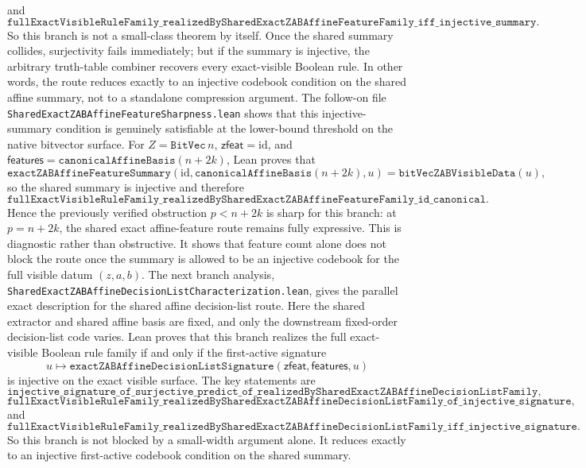 \documentclass[11pt]{article}
\theoremstyle{remark}
\begin{document}
and
\[
  \texttt{fullExactVisibleRuleFamily\_realizedBySharedExactZABAffineFeatureFamily\_iff\_injective\_summary}.
\]
So this branch is not a small-class theorem by itself.  Once the shared summary
collides, surjectivity fails immediately; but if the summary is injective, the
arbitrary truth-table combiner recovers every exact-visible Boolean rule.  In
other words, the route reduces exactly to an injective codebook condition on
the shared affine summary, not to a standalone compression argument.
The follow-on file \texttt{SharedExactZABAffineFeatureSharpness.lean} shows that
this injective-summary condition is genuinely satisfiable at the lower-bound
threshold on the native bitvector surface.  For \(Z = \texttt{BitVec}\, n\),
\(\mathsf{zfeat} = \mathrm{id}\), and
\(\mathsf{features} = \texttt{canonicalAffineBasis}(n + 2k)\), Lean proves that
\[
  \texttt{exactZABAffineFeatureSummary}(\mathrm{id},
  \texttt{canonicalAffineBasis}(n + 2k), u)
  = \texttt{bitVecZABVisibleData}(u),
\]
so the shared summary is injective and therefore
\[
  \texttt{fullExactVisibleRuleFamily\_realizedBySharedExactZABAffineFeatureFamily\_id\_canonical}.
\]
Hence the previously verified obstruction \(p < n + 2k\) is sharp for this
branch: at \(p = n + 2k\), the shared exact affine-feature route remains fully
expressive.  This is diagnostic rather than obstructive.  It shows that feature
count alone does not block the route once the summary is allowed to be an
injective codebook for the full visible datum \((z,a,b)\).
The next branch analysis,
\texttt{SharedExactZABAffineDecisionListCharacterization.lean}, gives the
parallel exact description for the shared affine decision-list route.  Here the
shared extractor and shared affine basis are fixed, and only the downstream
fixed-order decision-list code varies.  Lean proves that this branch realizes
the full exact-visible Boolean rule family if and only if the first-active
signature
\[
  u \mapsto \texttt{exactZABAffineDecisionListSignature}
    (\mathsf{zfeat},\mathsf{features},u)
\]
is injective on the exact visible surface.  The key statements are
\[
  \texttt{injective\_signature\_of\_surjective\_predict\_of\_realizedBySharedExactZABAffineDecisionListFamily},
\]
\[
  \texttt{fullExactVisibleRuleFamily\_realizedBySharedExactZABAffineDecisionListFamily\_of\_injective\_signature},
\]
and
\[
  \texttt{fullExactVisibleRuleFamily\_realizedBySharedExactZABAffineDecisionListFamily\_iff\_injective\_signature}.
\]
So this branch is not blocked by a small-width argument alone.  It reduces
exactly to an injective first-active codebook condition on the shared summary.
\end{document}
